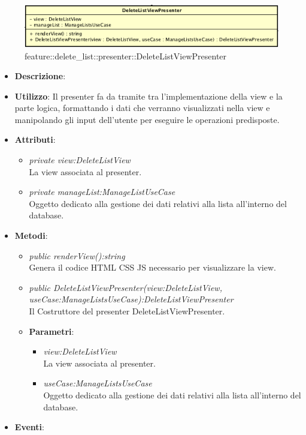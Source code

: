 \label{feature::delete\_list::presenter::DeleteListViewPresenter}
\begin{figure}[ht]
	\centering
	\includegraphics[scale=0.5]{Sezioni/SottosezioniST/img/app/DeleteListViewPresenter.png}
	\caption{feature::delete\_list::presenter::DeleteListViewPresenter}
\end{figure}

\begin{itemize}
\item \textbf{Descrizione}: 
\item \textbf{Utilizzo}: Il presenter fa da tramite tra l'implementazione della view e la parte logica, formattando i dati che verranno visualizzati nella view e manipolando gli input dell'utente per eseguire le operazioni predisposte.
\item \textbf{Attributi}: 
	\begin{itemize}
	\item \textit{private view:DeleteListView}\\
		La view associata al presenter.
	\item \textit{private manageList:ManageListUseCase}\\
				Oggetto dedicato alla gestione dei dati relativi alla lista all'interno del database.
	\end{itemize}
\item \textbf{Metodi}:
	\begin{itemize}
	\item \textit{public renderView():string}\\
	Genera il codice HTML CSS JS necessario per visualizzare la view.
	\item \textit{public DeleteListViewPresenter(view:DeleteListView, useCase:ManageListsUseCase):DeleteListViewPresenter}\\
	Il Costruttore del presenter DeleteListViewPresenter.
		\item{\textbf{Parametri}: \begin{itemize}
		\item \textit{view:DeleteListView}\\
			La view associata al presenter.
		\item \textit{useCase:ManageListsUseCase}\\
			Oggetto dedicato alla gestione dei dati relativi alla lista all'interno del database.
		\end{itemize}}
	\end{itemize}
\item \textbf{Eventi}:
\end{itemize}